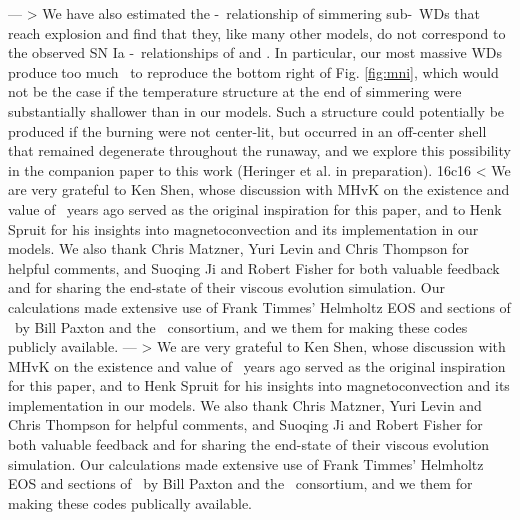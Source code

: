 ---
> We have also estimated the \Mtot-\MNi\ relationship of simmering sub-\Mch\ WDs that reach explosion and find that they, like many other models, do not correspond to the observed SN Ia \Mtot-\MNi\ relationships of \cite{scalzrs14} and \cite{chil+15}.  In particular, our most massive WDs produce too much \Ni\ to reproduce the bottom right of Fig. \ref{fig:mni}, which would not be the case if the temperature structure at the end of simmering were substantially shallower than in our models.  Such a structure could potentially be produced if the burning were not center-lit, but occurred in an off-center shell that remained degenerate throughout the runaway, and we explore this possibility in the companion paper to this work (Heringer et al. in preparation).
16c16
< We are very grateful to Ken Shen, whose discussion with MHvK on the existence and value of \Mcrit\ years ago served as the original inspiration for this paper, and to Henk Spruit for his insights into magnetoconvection and its implementation in our models.  We also thank Chris Matzner, Yuri Levin and Chris Thompson for helpful comments, and Suoqing Ji and Robert Fisher for both valuable feedback and for sharing the end-state of their viscous evolution simulation.  Our calculations made extensive use of Frank Timmes' Helmholtz EOS and sections of \mesa\ by Bill Paxton and the \mesa\ consortium, and we them for making these codes publicly available.  
---
> We are very grateful to Ken Shen, whose discussion with MHvK on the existence and value of \Mcrit\ years ago served as the original inspiration for this paper, and to Henk Spruit for his insights into magnetoconvection and its implementation in our models.  We also thank Chris Matzner, Yuri Levin and Chris Thompson for helpful comments, and Suoqing Ji and Robert Fisher for both valuable feedback and for sharing the end-state of their viscous evolution simulation.  Our calculations made extensive use of Frank Timmes' Helmholtz EOS and sections of \mesa\ by Bill Paxton and the \mesa\ consortium, and we them for making these codes publically available.  
